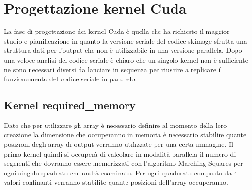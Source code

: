 \documentclass[12pt,a4paper]{report}
\begin{document}
\section{Progettazione kernel Cuda}
La fase di progettazione dei kernel Cuda è quella che ha richiesto il maggior studio e pianificazione in quanto la versione seriale del codice skimage sfrutta una struttura dati per l'output che non è utilizzabile in una versione parallela. \newline
Dopo una veloce analisi del codice seriale è chiaro che un singolo kernel non è sufficiente ne sono necessari diversi da lanciare in sequenza per riuscire a replicare il funzionamento del codice seriale in parallelo. 
\subsection{Kernel required\_memory}
Dato che per utilizzare gli array è necessario definire al momento della loro creazione la dimensione che occuperanno in memoria è necessario stabilire quante posizioni degli array di output verranno utilizzate per una certa immagine. \newline 
Il primo kernel quindi si occuperà di calcolare in modalità parallela il numero di segmenti che dovranno essere memorizzati con l'algoritmo Marching Squares per ogni singolo quadrato che andrà esaminato.
Per ogni quaderato composto da 4 valori confinanti verranno stabilite quante posizioni dell'array occuperanno. \\[10pt]
\end{document}
